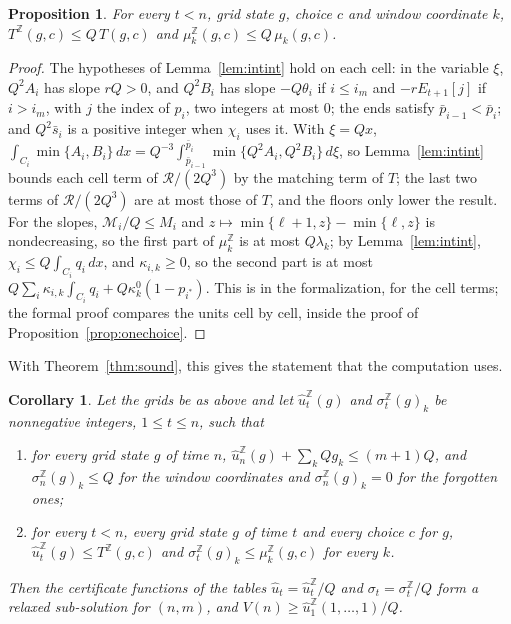 \documentclass[11pt]{amsart}
\newtheorem{proposition}[theorem]{Proposition}
\newtheorem{corollary}[theorem]{Corollary}
\theoremstyle{definition}
\numberwithin{equation}{section}
\newcommand{\lean}[1]{\ignorespaces}
\begin{document}
\begin{proposition}\label{prop:integer}\lean{Robbins.Cert.SO.cell2_div_le, Robbins.Cert.SO.chord_div_le, Robbins.Cert.SO.MC_le_aux}
For every $t<n$, grid state $g$, choice $c$ and window coordinate $k$, $T^{\mathbb Z}(g,c)\le Q\,T(g,c)$ and $\mu^{\mathbb Z}_k(g,c)\le Q\,\mu_k(g,c)$.
\end{proposition}

\begin{proof}
The hypotheses of Lemma~\ref{lem:intint} hold on each cell: in the variable $\xi$, $Q^2A_i$ has slope $rQ>0$, and $Q^2B_i$ has slope $-Q\theta_i$ if $i\le i_m$ and $-r E_{t+1}[j]$ if $i>i_m$, with $j$ the index of $p_i$, two integers at most $0$; the ends satisfy $\bar p_{i-1}<\bar p_i$; and $Q^2\bar s_i$ is a positive integer when $\chi_i$ uses it. With $\xi=Qx$, $\int_{C_i}\min\{A_i,B_i\}\,dx=Q^{-3}\int_{\bar p_{i-1}}^{\bar p_i}\min\{Q^2A_i,Q^2B_i\}\,d\xi$, so Lemma~\ref{lem:intint} bounds each cell term of $\mathcal R/(2Q^3)$ by the matching term of $T$; the last two terms of $\mathcal R/(2Q^3)$ are at most those of $T$, and the floors only lower the result. For the slopes, $\mathcal M_{i}/Q\le M_{i}$ and $z\mapsto\min\{\ell+1,z\}-\min\{\ell,z\}$ is nondecreasing, so the first part of $\mu^{\mathbb Z}_k$ is at most $Q\lambda_k$; by Lemma~\ref{lem:intint}, $\chi_i\le Q\int_{C_i}q_i\,dx$, and $\kappa_{i,k}\ge0$, so the second part is at most $Q\sum_i\kappa_{i,k}\int_{C_i}q_i+Q\kappa^0_k(1-p_{i^*})$. This is  in the formalization, for the cell terms; the formal proof compares the units cell by cell, inside the proof of Proposition~\ref{prop:onechoice}.
\end{proof}

With Theorem~\ref{thm:sound}, this gives the statement that the computation uses.

\begin{corollary}\label{cor:integer}\lean{Robbins.Cert.SO.le_v_of_tables, Robbins.Cert.SO.relaxed_of_tables}
Let the grids be as above and let $\hat u^{\mathbb Z}_t(g)$ and $\sigma^{\mathbb Z}_t(g)_k$ be nonnegative integers, $1\le t\le n$, such that
\begin{enumerate}[label=(\roman*)]
\item for every grid state $g$ of time $n$, $\hat u^{\mathbb Z}_n(g)+\sum_kQg_k\le(m+1)Q$, and $\sigma^{\mathbb Z}_n(g)_k\le Q$ for the window coordinates and $\sigma^{\mathbb Z}_n(g)_k=0$ for the forgotten ones;
\item for every $t<n$, every grid state $g$ of time $t$ and every choice $c$ for $g$, $\hat u^{\mathbb Z}_t(g)\le T^{\mathbb Z}(g,c)$ and $\sigma^{\mathbb Z}_t(g)_k\le\mu^{\mathbb Z}_k(g,c)$ for every $k$.
\end{enumerate}
Then the certificate functions of the tables $\hat u_t=\hat u^{\mathbb Z}_t/Q$ and $\sigma_t=\sigma^{\mathbb Z}_t/Q$ form a relaxed sub-solution for $(n,m)$, and $V(n)\ge\hat u^{\mathbb Z}_1(1,\dots,1)/Q$.
\end{corollary}
\end{document}
